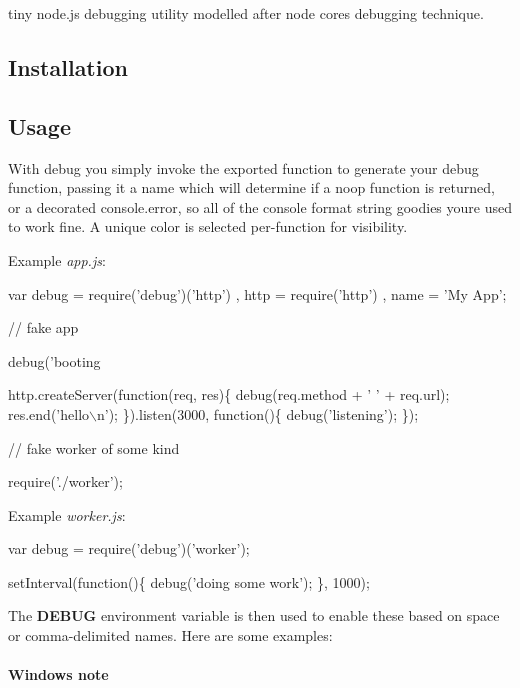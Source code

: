 tiny node.\+js debugging utility modelled after node core\textquotesingle{}s debugging technique.

\subsection*{Installation}




\subsection*{Usage}

With {\ttfamily debug} you simply invoke the exported function to generate your debug function, passing it a name which will determine if a noop function is returned, or a decorated {\ttfamily console.\+error}, so all of the {\ttfamily console} format string goodies you\textquotesingle{}re used to work fine. A unique color is selected per-\/function for visibility.

Example {\itshape app.\+js}\+:


\begin{DoxyCode}
var debug = require('debug')('http')
  , http = require('http')
  , name = 'My App';

// fake app

debug('booting %

http.createServer(function(req, res)\{
  debug(req.method + ' ' + req.url);
  res.end('hello\(\backslash\)n');
\}).listen(3000, function()\{
  debug('listening');
\});

// fake worker of some kind

require('./worker');
\end{DoxyCode}


Example {\itshape worker.\+js}\+:


\begin{DoxyCode}
var debug = require('debug')('worker');

setInterval(function()\{
  debug('doing some work');
\}, 1000);
\end{DoxyCode}


The {\bfseries D\+E\+B\+UG} environment variable is then used to enable these based on space or comma-\/delimited names. Here are some examples\+:





\paragraph*{Windows note}

